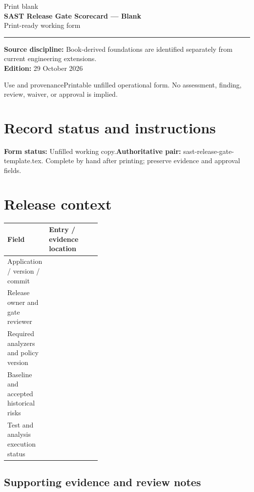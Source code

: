 \documentclass[10pt,letterpaper]{article}
\newcommand{\writearea}[1]{\par\begin{tcolorbox}[colback=white,colframe=linegray,boxrule=0.5pt,height=#1,sharp corners]\mbox{}\end{tcolorbox}\par}
\begin{document}
\hypersetup{pageanchor=false}%
\begin{titlepage}
\vspace*{1.0in}
{\color{bluegray}\Large Print blank}\\[1.0em]
{\color{navy}\Huge\bfseries SAST Release Gate Scorecard --- Blank}\\[0.7em]
{\Large Print-ready working form}\\[2.0em]
\rule{\linewidth}{1.0pt}
\vfill
\textbf{Source discipline:} Book-derived foundations are identified separately from current engineering extensions.\\
\textbf{Edition:} 29 October 2026
\end{titlepage}\hypersetup{pageanchor=true}
\tableofcontents
\clearpage
\begin{focusbox}{Use and provenance}Printable unfilled operational form. No assessment, finding, review, waiver, or approval is implied.\end{focusbox}
\section{Record status and instructions}
\textbf{Form status:} Unfilled working copy.\quad\textbf{Authoritative pair:} sast-release-gate-template.tex. Complete by hand after printing; preserve evidence and approval fields.

\section{Release context}
\begin{tabularx}{\linewidth}{@{}p{0.38\linewidth}Y@{}}
\toprule Field & Entry / evidence location\\\midrule
Application / version / commit & \\[1.0em]
\midrule
Release owner and gate reviewer & \\[1.0em]
\midrule
Required analyzers and policy version & \\[1.0em]
\midrule
Baseline and accepted historical risks & \\[1.0em]
\midrule
Test and analysis execution status & \\[1.0em]
\midrule
\end{tabularx}
\subsection{Supporting evidence and review notes}
\writearea{1.45in}
\clearpage
\end{document}
